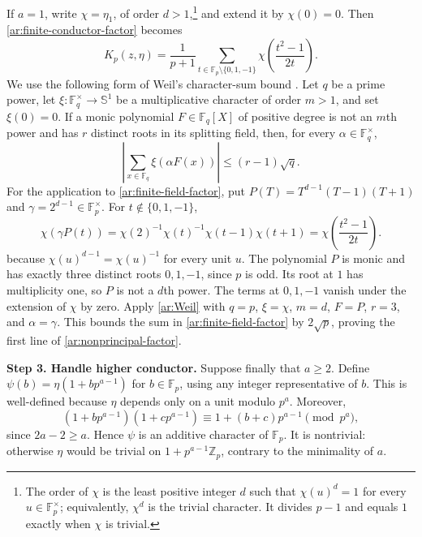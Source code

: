 \documentclass[twoside]{aomart}
\makeatletter
\theoremstyle{paperplain}
\theoremstyle{paperdefinition}
\renewenvironment{proof}[1][\proofname]{\par\pushQED{\qed}%
  \normalfont\topsep6\p@\@plus3\p@\relax\trivlist
  \item[\hskip\labelsep\itshape #1\@addpunct{.}]\ignorespaces
}{\popQED\endtrivlist\@endpefalse}
\newcommand{\Z}{\mathbb Z}
\numberwithin{equation}{section}
\makeatother
\begin{document}
\begin{proof}
If $a=1$, write $\chi=\eta_1$, of order $d>1$,\footnote{The
order of $\chi$ is the least positive integer $d$ such that
$\chi(u)^d=1$ for every $u\in\mathbb F_p^\times$; equivalently,
$\chi^d$ is the trivial character. It divides $p-1$ and equals
$1$ exactly when $\chi$ is trivial. } and extend it by $\chi(0)=0$. Then \eqref{ar:finite-conductor-factor} becomes
\begin{equation}
 K_p(z,\eta)=\frac1{p+1}
 \sum_{t\in\mathbb F_p\setminus\{0,1,-1\}}
          \chi\left(\frac{t^2-1}{2t}\right).
 \label{ar:finite-field-factor}
\end{equation}
We use the following form of Weil's character-sum bound
\cite[Theorem 5.41]{LidlNiederreiter}. Let $q$ be a prime power,
let $\xi:\mathbb F_q^\times\to\mathbb S^1$ be a multiplicative
character of order $m>1$, and set $\xi(0)=0$.
If a monic polynomial $F\in\mathbb F_q[X]$ of positive degree
is not an $m$th power and has $r$ distinct roots in its splitting
field, then, for every $\alpha\in\mathbb F_q^\times$,
\begin{equation}
 \left|\sum_{x\in\mathbb F_q}\xi(\alpha F(x))\right|
 \le(r-1)\sqrt q.
 \label{ar:Weil}
\end{equation}
For the application to \eqref{ar:finite-field-factor}, put
$P(T)=T^{d-1}(T-1)(T+1)$ and
$\gamma=2^{d-1}\in\mathbb F_p^\times$.
For $t\notin\{0,1,-1\}$,
\begin{equation*}
 \chi(\gamma P(t))=\chi(2)^{-1}\chi(t)^{-1}\chi(t-1)\chi(t+1)
 =\chi\left(\frac{t^2-1}{2t}\right).
\end{equation*}
because $\chi(u)^{d-1}=\chi(u)^{-1}$ for every unit $u$.
The polynomial $P$ is monic and has exactly three distinct roots
$0,1,-1$, since $p$ is odd. Its root at $1$ has multiplicity
one, so $P$ is not a $d$th power. The terms at $0,1,-1$ vanish
under the extension of $\chi$ by zero.
Apply \eqref{ar:Weil} with $q=p$, $\xi=\chi$, $m=d$,
$F=P$, $r=3$, and $\alpha=\gamma$.
This bounds the sum in \eqref{ar:finite-field-factor} by
$2\sqrt p$, proving the first line of
\eqref{ar:nonprincipal-factor}.

\par
\medskip
\noindent\textbf{Step 3. Handle higher conductor.}
Suppose finally that $a\ge2$. Define
$\psi(b)=\eta(1+bp^{a-1})$ for $b\in\mathbb F_p$, using any
integer representative of $b$. This is well-defined because
$\eta$ depends only on a unit modulo $p^a$. Moreover,
\begin{equation*}
 (1+bp^{a-1})(1+cp^{a-1})
 \equiv1+(b+c)p^{a-1}\pmod{p^a},
\end{equation*}
since $2a-2\ge a$. Hence $\psi$ is an additive character of
$\mathbb F_p$. It is nontrivial: otherwise $\eta$ would be
trivial on $1+p^{a-1}\Z_p$, contrary to the minimality of $a$.


\end{proof}
\end{document}
